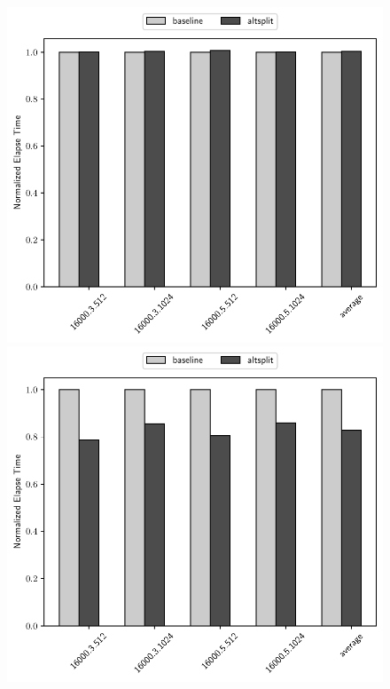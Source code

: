 \begin{figure}[H]
    \centerline{
        \includegraphics[scale=0.60]{altsplit/figs/mn4/16000_avgs_80.pdf}
        \includegraphics[scale=0.60]{altsplit/figs/mn4/16000_avgs_160.pdf}
    }
    \centerline{
}
\end{figure}
